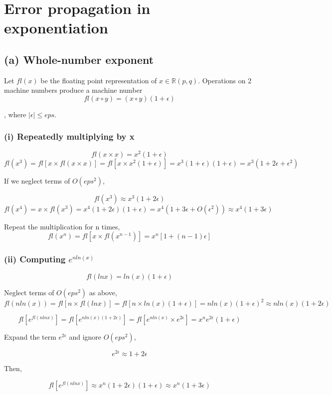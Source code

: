 \documentclass[a4paper, 12pt]{article}
\begin{document}
\section{Error propagation in exponentiation}


\subsection*{(a) Whole-number exponent}
Let $fl(x)$ be the floating point representation of $x\in \mathbb{R}(p,q)$. Operations on 2 machine numbers produce a machine number
\[fl(x\circ y) = (x\circ y)(1+\epsilon)\]

, where $|\epsilon| \leq eps$.

\subsubsection*{(i) Repeatedly multiplying by x}

\[fl(x\times x) = x^2(1+\epsilon)\]
\[fl(x^3)=fl[x\times fl(x\times x)] = fl[x\times x^2(1+\epsilon)] = x^3 (1+\epsilon)(1+\epsilon) = x^3(1+2\epsilon+ \epsilon ^2)\]

If we neglect terms of $O(eps^2)$,

\[fl(x^3) \approx x^3(1+2\epsilon)\]
\[fl(x^4) = x\times fl(x^3) = x^4(1+2\epsilon)(1+\epsilon)= x^4 (1+3\epsilon +O(\epsilon^2))\approx x^4 (1+3\epsilon)\]

Repeat the multiplication for n times,
\[fl(x^n) = fl[x\times fl(x^{n-1})] = x^n[1+(n-1)\epsilon]\]

\subsubsection*{(ii) Computing $e^{nln(x)}$}

\[fl(lnx)=ln(x)(1+\epsilon)\]

Neglect terms of $O(eps^2)$ as above,
\[fl(nln(x)) = fl[n\times fl(lnx)] = fl[n\times ln(x)(1+\epsilon)]=nln(x)(1+\epsilon)^2\approx nln(x)(1+2\epsilon)\]

\[fl[e^{fl(nlnx)}]= fl[e^{nln(x)(1+2\epsilon)}] = fl[e^{nln(x)}\times e^{2\epsilon}] = x^ne^{2\epsilon}(1+\epsilon)\]

Expand the term $e^{2\epsilon}$ and ignore $O(eps^2)$,

\[e^{2\epsilon}\approx 1 + 2\epsilon\]

Then,

\[fl[e^{fl(nlnx)}]\approx x^n(1+2\epsilon)(1+\epsilon) \approx x^n(1+3\epsilon)\]
\end{document}
